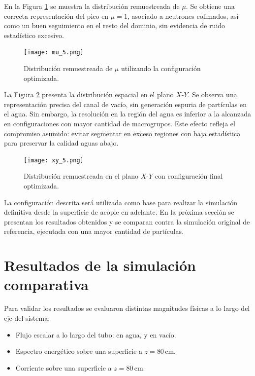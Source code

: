 En la Figura \ref{fig:mu_5} se muestra la distribución remuestreada de $\mu$. Se obtiene una correcta representación del pico en $\mu = 1$, asociado a neutrones colimados, así como un buen seguimiento en el resto del dominio, sin evidencia de ruido estadístico excesivo.

\begin{figure}[H]
    \centering
    \texttt{[image: mu\_5.png]}
    \caption{Distribución remuestreada de $\mu$ utilizando la configuración optimizada.}
    \label{fig:mu_5}
\end{figure}

La Figura \ref{fig:xy_5} presenta la distribución espacial en el plano $X$-$Y$. Se observa una representación precisa del canal de vacío, sin generación espuria de partículas en el agua. Sin embargo, la resolución en la región del agua es inferior a la alcanzada en configuraciones con mayor cantidad de macrogrupos. Este efecto refleja el compromiso asumido: evitar segmentar en exceso regiones con baja estadística para preservar la calidad aguas abajo.

\begin{figure}[H]
    \centering
    \texttt{[image: xy\_5.png]}
    \caption{Distribución remuestreada en el plano $X$-$Y$ con configuración final optimizada.}
    \label{fig:xy_5}
\end{figure}


La configuración descrita será utilizada como base para realizar la simulación definitiva desde la superficie de acople en adelante. En la próxima sección se presentan los resultados obtenidos y se comparan contra la simulación original de referencia, ejecutada con una mayor cantidad de partículas.

\section{Resultados de la simulación comparativa}

Para validar los resultados se evaluaron distintas magnitudes físicas a lo largo del eje del sistema:

\begin{itemize}
    \item Flujo escalar a lo largo del tubo: en agua, y en vacío.
    \item Espectro energético sobre una superficie a $z = 80\,\text{cm}$.
    \item Corriente sobre una superficie a $z = 80\,\text{cm}$.
\end{itemize}

